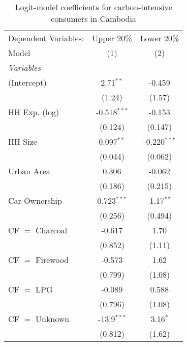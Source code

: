 
\begin{table}[htbp!]
   \centering
   \small
   \begin{adjustbox}{width = 1\textwidth, max height = 0.95\textheight, center}
      \begin{threeparttable}[b]
         \caption{\label{tab:Logit_1_KHM} Logit-model coefficients for carbon-intensive consumers in Cambodia}
         \begin{tabular}{lcc}
            \tabularnewline \midrule \midrule
            Dependent Variables: & Upper 20\%     & Lower 20\%\\   
            Model                & (1)            & (2)\\  
            \midrule
            \emph{Variables}\\
            (Intercept)          & 2.71$^{**}$    & -0.459\\   
                                 & (1.24)         & (1.57)\\   
            HH Exp. (log)        & -0.518$^{***}$ & -0.153\\   
                                 & (0.124)        & (0.147)\\   
            HH Size              & 0.097$^{**}$   & -0.220$^{***}$\\   
                                 & (0.044)        & (0.062)\\   
            Urban Area           & 0.306          & -0.062\\   
                                 & (0.186)        & (0.215)\\   
            Car Ownership        & 0.723$^{***}$  & -1.17$^{**}$\\   
                                 & (0.256)        & (0.494)\\   
            CF $=$ Charcoal      & -0.617         & 1.70\\   
                                 & (0.852)        & (1.11)\\   
            CF $=$ Firewood      & -0.573         & 1.62\\   
                                 & (0.799)        & (1.08)\\   
            CF $=$ LPG           & -0.089         & 0.588\\   
                                 & (0.796)        & (1.08)\\   
            CF $=$ Unknown       & -13.9$^{***}$  & 3.16$^{*}$\\   
                                 & (0.812)        & (1.62)\\   

\end{tabular}
\end{threeparttable}
\end{adjustbox}
\end{table}

